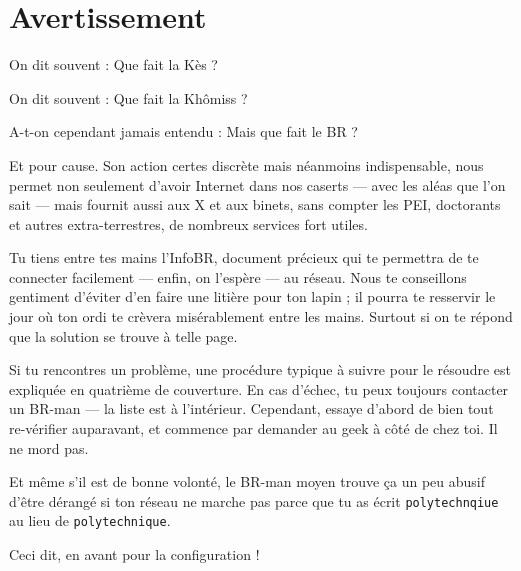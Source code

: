 
\section*{Avertissement}

On dit souvent : \og Que fait la Kès ? \fg

On dit souvent : \og Que fait la Khômiss ? \fg

A-t-on cependant jamais entendu : \og Mais que fait le BR ? \fg

Et pour cause. Son action certes discrète mais néanmoins indispensable, nous permet non seulement d'avoir Internet dans nos caserts --- avec les aléas que l'on sait --- mais fournit aussi aux X et aux binets,
sans compter les PEI, doctorants et autres extra-terrestres, de nombreux services fort utiles.

Tu tiens entre tes mains l'InfoBR, document pr\'ecieux qui te permettra de te connecter facilement
--- enfin, on l'esp\`ere --- au r\'eseau.
Nous te conseillons gentiment d'\'eviter d'en faire une liti\`ere pour ton lapin ; il pourra te resservir le jour o\`u ton ordi te cr\`evera mis\'erablement entre les
mains. Surtout si on te r\'epond que la solution se trouve \`a telle page.

Si tu rencontres un probl\`eme, une proc\'edure typique \`a suivre pour le r\'esoudre est expliqu\'ee en quatri\`eme de couverture.
En cas d'échec, tu peux toujours contacter un BR-man --- la liste est \`a l'int\'erieur.
Cependant, essaye d'abord de bien tout re-v\'erifier auparavant, et commence par demander au geek à côté de chez toi. Il ne mord pas.

Et m\^eme s'il est de bonne volont\'e, le BR-man moyen trouve ça un peu abusif d'\^etre d\'erang\'e si ton r\'eseau ne
marche pas parce que tu as \'ecrit \texttt{polytechnqiue} au lieu de \texttt{polytechnique}.

Ceci dit, en avant pour la configuration !
